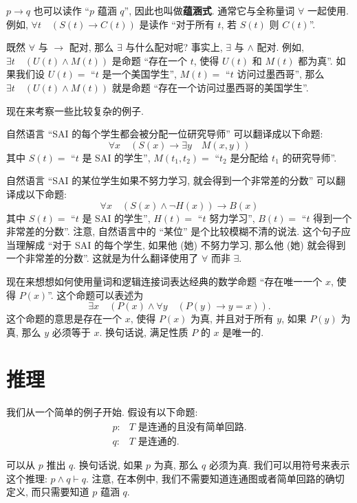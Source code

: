 $p \rightarrow q$ 也可以读作 ``$p$ 蕴涵 $q$'', 因此也叫做\textbf{蕴涵式}. 通常它与全称量词 $\forall$ 一起使用. 例如, $\forall t\quad (S(t) \rightarrow C(t))$ 是读作 ``对于所有 $t$, 若 $S(t)$ 则 $C(t)$''.

既然 $\forall$ 与 $\rightarrow$ 配对, 那么 $\exists$ 与什么配对呢? 事实上, $\exists$ 与 $\wedge$ 配对. 例如, $\exists t\quad (U(t) \wedge M(t))$ 是命题 ``存在一个 $t$, 使得 $U(t)$ 和 $M(t)$ 都为真''. 如果我们设 $U(t)=$ ``$t$ 是一个美国学生'', $M(t)=$ ``$t$ 访问过墨西哥'', 那么 $\exists t\quad (U(t) \wedge M(t))$ 就是命题 ``存在一个访问过墨西哥的美国学生''.

现在来考察一些比较复杂的例子.

\begin{example}
    自然语言 ``SAI 的每个学生都会被分配一位研究导师'' 可以翻译成以下命题:
    \[\forall x\quad (S(x) \rightarrow \exists y\quad M(x, y))\]
    其中 $S(t)=$ ``$t$ 是 SAI 的学生'', $M(t_1, t_2)=$ ``$t_2$ 是分配给 $t_1$ 的研究导师''.

    自然语言 ``SAI 的某位学生如果不努力学习, 就会得到一个非常差的分数'' 可以翻译成以下命题:
    \[\forall x\quad (S(x) \wedge \neg H(x)) \rightarrow B(x)\]
    其中 $S(t)=$ ``$t$ 是 SAI 的学生'', $H(t)=$ ``$t$ 努力学习'', $B(t)=$ ``$t$ 得到一个非常差的分数''. 注意, 自然语言中的 ``某位'' 是个比较模糊不清的说法. 这个句子应当理解成 ``对于 SAI 的每个学生, 如果他 (她) 不努力学习, 那么他 (她) 就会得到一个非常差的分数''. 这就是为什么翻译使用了 $\forall$ 而非 $\exists$.
\end{example}

\begin{example}
    现在来想想如何使用量词和逻辑连接词表达经典的数学命题 ``存在唯一一个 $x$, 使得 $P(x)$''. 这个命题可以表述为
    \[\exists x\quad (P(x) \wedge \forall y\quad (P(y) \rightarrow y = x)).\]
    这个命题的意思是存在一个 $x$, 使得 $P(x)$ 为真, 并且对于所有 $y$, 如果 $P(y)$ 为真, 那么 $y$ 必须等于 $x$. 换句话说, 满足性质 $P$ 的 $x$ 是唯一的.
\end{example}

\section{推理}
我们从一个简单的例子开始. 假设有以下命题:
\begin{align*}
    p\colon &T\text{ 是连通的且没有简单回路.} \\
    q\colon &T\text{ 是连通的.}
\end{align*}

可以从 $p$ 推出 $q$. 换句话说, 如果 $p$ 为真, 那么 $q$ 必须为真. 我们可以用符号来表示这个推理: $p\wedge q \vdash q$. 注意, 在本例中, 我们不需要知道连通图或者简单回路的确切定义, 而只需要知道 $p$ 蕴涵 $q$. 

